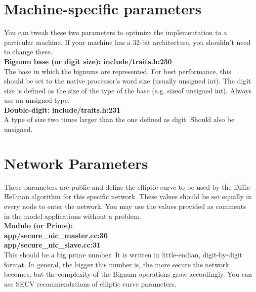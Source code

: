 \documentclass[a4paper,10pt]{article}   %
\begin{document}
\section{Machine-specific parameters}
	You can tweak these two parameters to optimize the implementation to a particular machine. If your machine has a 32-bit architecture, you shouldn't need to change these.\\

		\textbf{Bignum base (or digit size): include/traits.h:230} \\
		\indent The base in which the bignums are represented. For best performance, this should be set to the native processor's word size (usually unsigned int). The digit size is defined as the size of the type of the base (e.g. sizeof unsigned int). Always use an unsigned type.\\

		\textbf{Double-digit: include/traits.h:231} \\
		\indent A type of size two times larger than the one defined as digit. Should also be unsigned.\\

\section{Network Parameters}
	These parameters are public and define the elliptic curve to be used by the Diffie-Hellman algorithm for this specific network. These values should be set equally in every node to enter the network. You may use the values provided as comments in the model applications without a problem.\\

		\textbf{Modulo (or Prime):\\app/secure\_nic\_master.cc:30\\app/secure\_nic\_slave.cc:31} \\
		\indent This should be a big prime number. It is written in little-endian, digit-by-digit format. In general, the bigger this number is, the more secure the network becomes, but the complexity of the Bignum operations grow accordingly. You can use SECV \cite{SECV2} recommendations of elliptic curve parameters.\\ %
\end{document}
